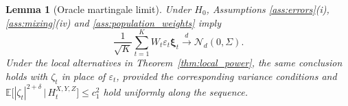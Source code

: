 \documentclass[12pt]{article}
\def\E{\mathbb{E}}
\newtheorem{lemma}[theorem]{Lemma}
\newcommand\given{\,|\,}
\numberwithin{equation}{section}
\begin{document}
 

 
\begin{lemma}[Oracle martingale limit]
\label{lem:leading-term}
Under \(H_0\), Assumptions
\ref{ass:errors}(i), \ref{ass:mixing}(iv) and \ref{ass:population_weights} imply
\begin{equation}
\label{eq:leading-null}
\frac1{\sqrt K}\sum_{t=1}^K W_t\varepsilon_t\boldsymbol\xi_t
\xrightarrow{d}\mathcal N_d(0,\Sigma).
\end{equation}
Under the local alternatives in Theorem~\ref{thm:local_power}, the same
conclusion holds with \(\zeta_t\) in place of \(\varepsilon_t\), provided
the corresponding variance conditions and
$\E\big[|\zeta_t|^{2+\delta}\given H_t^{X,Y,Z}\big]
\leq c_1^2$ hold uniformly along the sequence.
\end{lemma}
\end{document}
